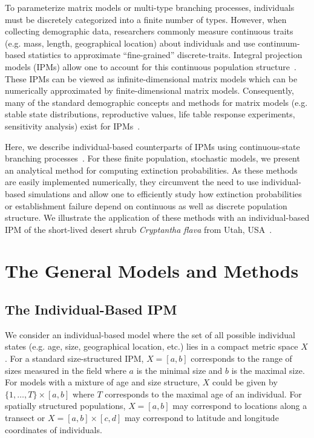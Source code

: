 \documentclass[12pt]{amsart}\usepackage[]{graphicx}\usepackage[]{color}
\begin{document}
To parameterize matrix models or multi-type branching processes, individuals must be discretely categorized into a finite number of types. However, when collecting demographic data, researchers commonly measure continuous traits (e.g. mass, length, geographical location) about individuals and use continuum-based statistics to approximate ``fine-grained'' discrete-traits. Integral projection models (IPMs) allow one to account for this continuous population structure~\citep{easterling-etal-00}. These IPMs can be viewed as infinite-dimensional matrix models which can be numerically approximated by finite-dimensional matrix models. Consequently, many of the standard demographic concepts and methods for matrix models (e.g. stable state distributions, reproductive values, life table response experiments, sensitivity analysis) exist for IPMs~\citep{easterling-etal-00, ellner-rees-06, ellner-rees-07, rees-ellner-09, coulson-12, tpb-12, metcalf-etal-13, rees-etal-14, merow-etal-14}.

Here, we describe individual-based counterparts of IPMs using continuous-state branching processes~\citep{harris-63}. For these finite population, stochastic models, we present an analytical method for computing extinction probabilities. As these methods are easily implemented numerically, they circumvent the need to use individual-based simulations and allow one to efficiently study how extinction probabilities or establishment failure depend on continuous as well as discrete population structure. We illustrate the application of these methods with an individual-based IPM of the short-lived desert shrub \emph{Cryptantha flava} from Utah, USA~\citep{salguero-etal-12,salguero-gomez-etal-14}.


\section*{The General Models and Methods}


\subsection*{The Individual-Based IPM}
We consider an individual-based model where the set of all possible individual states (e.g. age, size, geographical location, etc.) lies in a compact metric space $X$. For a standard size-structured IPM, $X=[a, b]$ corresponds to the range of sizes measured in the field where $a$ is the minimal size and $b$ is the maximal size. For models with a mixture of age and size structure, $X$ could be given by $\{1, \dots, T\}\times [a, b]$ where $T$ corresponds to the maximal age of an individual. For spatially structured populations, $X=[a,b]$ may correspond to locations along a transect or $X=[a,b]\times [c,d]$ may correspond to latitude and longitude coordinates of individuals.
\end{document}
